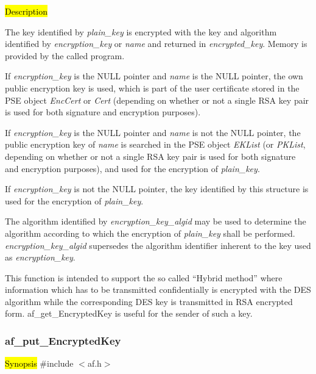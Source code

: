 




\hl{Description}

The key identified by {\em plain\_key} is encrypted with the key and algorithm identified by
{\em encryption\_key} or {\em name} and returned in 
{\em encrypted\_key}. Memory is provided by the called program. 

If {\em encryption\_key} is the NULL pointer and {\em name} is the NULL pointer,
the own public encryption key is used, which is part of the user certificate stored in the PSE object
{\em EncCert} or {\em Cert} (depending on whether or not a single RSA key pair is used for both signature and
encryption purposes). 

If {\em encryption\_key} is the NULL pointer and {\em name} 
is not the NULL pointer, the public encryption key of {\em name} is searched in 
the PSE object {\em EKList} (or {\em PKList}, depending on whether or not a single RSA key pair is used for both signature and
encryption purposes), and used for the encryption of {\em plain\_key}.

If {\em encryption\_key} is not the NULL pointer, the key identified by this structure
is used for the encryption of {\em plain\_key}. 

The algorithm identified by {\em encryption\_key\_algid} may be used to determine the algorithm
according to which the encryption of {\em plain\_key} shall be performed. {\em encryption\_key\_algid}
supersedes the algorithm identifier inherent to the key used as {\em encryption\_key}. 

This function is intended to support the so called ``Hybrid method'' where information which
has to be transmitted confidentially is encrypted with the DES algorithm while the corresponding DES key
is transmitted in RSA encrypted form. af\_get\_EncryptedKey is useful for the sender
of such a key.

\subsubsection{af\_put\_EncryptedKey}
\label{af_add_CertificatePairSet}
\hl{Synopsis}
\#include $<$af.h$>$

